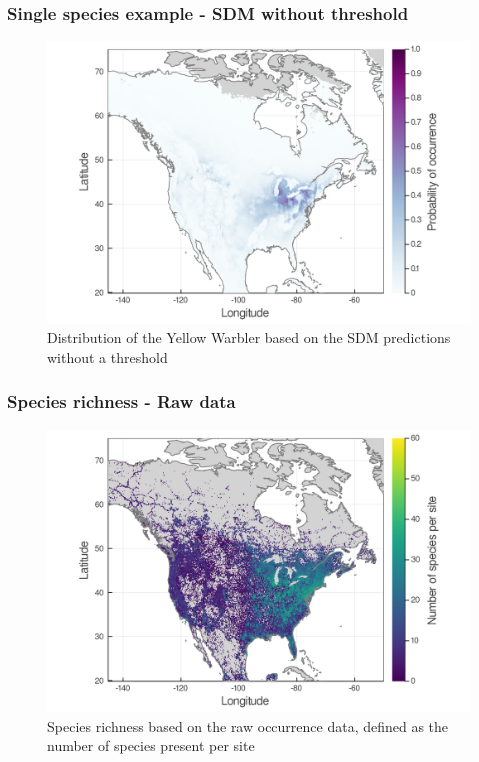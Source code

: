 \documentclass[10pt]{beamer}
\begin{document}
\begin{frame}
  \frametitle{Single species example - SDM without threshold}
  \begin{figure}
    \centering
    \hspace*{-0cm}\includegraphics[scale=0.17]{fig/01_sdm_singlesp.png}
    \caption{Distribution of the Yellow Warbler based on the SDM predictions without a threshold}
  \end{figure}
\end{frame}

\begin{frame}
  \frametitle{Species richness - Raw data}
  \begin{figure}
    \centering
    \hspace*{-0cm}\includegraphics[scale=0.17]{fig/03_raw_richness.png}
    \caption{Species richness based on the raw occurrence data, defined as the number of species present per site}
  \end{figure}
\end{frame}
\end{document}
